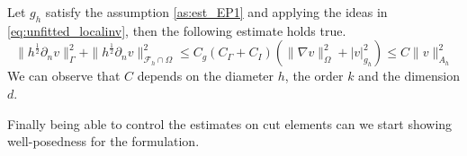 \begin{corollary}
    \label{cor:g_h_inverste_results}
    Let $g_{h}$ satisfy the assumption \ref{as:est_EP1} and applying the ideas in \eqref{eq:unfitted_localinv}, then the following estimate holds true.
    \[
    \| h^{\frac{1}{2}} \partial _{n} v \|_{ \Gamma   }^{ 2 } + \| h^{\frac{1}{2}} \partial _{n} v \|_{ \mathcal{F} _{h} \cap \Omega  }^{ 2 }  \le  C_{g}( C_{\Gamma } + C_{I}) ( \| \nabla v  \|_{ \Omega   }^{2  }
     + \left\lvert v \right\rvert _{g_{h}}^{2}) \le C \| v \|_{ A_{h} }^{ 2 }
    \]
    We can observe that $C$ depends on the diameter $h$, the order $k $ and the dimension $d$.
\end{corollary}


Finally being able to control the estimates on cut elements can we start showing well-posedness for the formulation.

